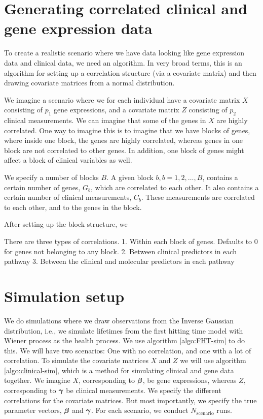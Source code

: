 \section{Generating correlated clinical and gene expression data}
To create a realistic scenario where we have data looking like gene expression data and clinical data, we need an algorithm.
In very broad terms, this is an algorithm for setting up a correlation structure (via a covariate matrix) and then drawing covariate matrices from a
normal distribution.

We imagine a scenario where we for each individual have a covariate matrix $X$ consisting of $p_1$ gene expressions, and a
covariate matrix $Z$ consisting of $p_2$ clinical measurements.
We can imagine that some of the genes in $X$ are highly correlated. One way to imagine this is to imagine that we have blocks of genes,
where inside one block, the genes are highly correlated, whereas genes in one block are not correlated to other genes.
In addition, one block of genes might affect a block of clinical variables as well.

We specify a number of blocks $B$. A given block $b,b=1,2,\ldots,B$, contains a certain number of genes, $G_b$, which are correlated to each other.
It also contains a certain number of clinical measurements, $C_b$. These measurements are correlated to each other, and to the genes in the block.

After setting up the block structure, we 

There are three types of correlations.
1. Within each block of genes. Defaults to 0 for genes not belonging to any block.
2. Between clinical predictors in each pathway
3. Between the clinical and molecular predictors in each pathway


\section{Simulation setup}
We do simulations where we draw observations from the Inverse Gaussian distribution, i.e., we simulate lifetimes from the first hitting time model with Wiener process as the health process. We use algorithm \eqref{algo:FHT-sim} to do this. We will have two scenarios: One with no correlation, and one with a lot of correlation. To simulate the covariate matrices $X$ and $Z$ we will use algorithm \eqref{algo:clinical-sim}, which is a method for simulating clinical and gene data together. We imagine $X$, corresponding to $\boldsymbol{\beta}$, be gene expressions, whereas $Z$, corresponding to $\boldsymbol{\gamma}$ be clinical measurements. We specify the different correlations for the covariate matrices. But most importantly, we specify the true parameter vectors, $\boldsymbol{\beta}$ and $\boldsymbol{\gamma}$. For each scenario, we conduct $N_{\text{scenario}}$ runs.

